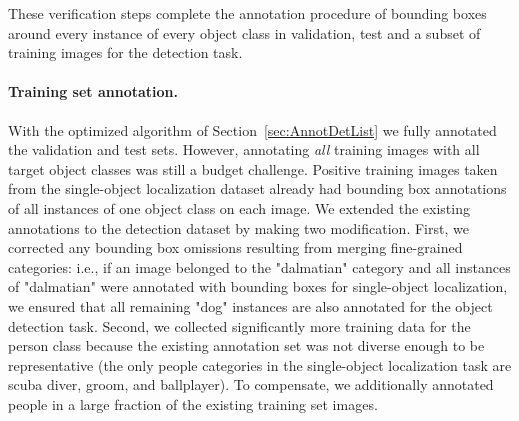 \begin{appendices}
These verification steps complete the annotation procedure of bounding boxes around every instance of every object class in 
validation, test and a subset of training images for the detection task.

\paragraph{Training set annotation.}
With the optimized algorithm of Section~\ref{sec:AnnotDetList} we fully annotated the validation and test sets. However, annotating \emph{all} training images 
with all target object classes was still a budget challenge.
Positive training images taken from the single-object localization dataset already had bounding box annotations of all instances
of one object class on each image. We extended the existing annotations to the detection dataset by making two modification. First, we corrected any bounding box omissions resulting from merging fine-grained categories: 
i.e., if an image belonged to the "dalmatian" category and all instances of "dalmatian" were annotated with bounding boxes for single-object localization, we ensured that
all remaining "dog" instances are also annotated for the object detection task. 
Second, we collected significantly more training data for the person class because the existing annotation set was not diverse enough to be
representative (the only people categories in the single-object localization task are scuba diver, groom, and ballplayer). To compensate,
we additionally annotated people in a large fraction of the existing training set images. 

\end{appendices}
